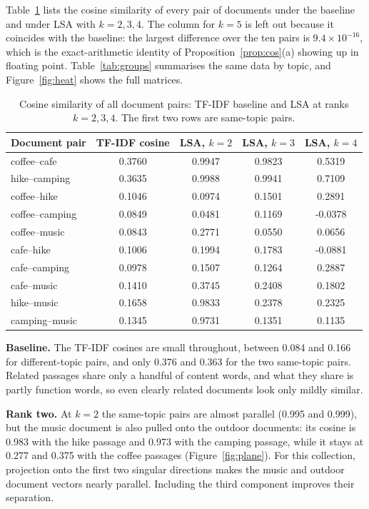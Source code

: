 \documentclass[12pt,a4paper]{report}
\theoremstyle{plain}
\theoremstyle{definition}
\theoremstyle{remark}
\theoremstyle{definition}
\begin{document}
Table~\ref{tab:pairs} lists the cosine similarity of every pair of documents under the baseline and under LSA with $k=2,3,4$. The column for $k=5$ is left out because it coincides with the baseline: the largest difference over the ten pairs is $9.4\times10^{-16}$, which is the exact-arithmetic identity of Proposition~\ref{prop:cos}(a) showing up in floating point. Table~\ref{tab:groups} summarises the same data by topic, and Figure~\ref{fig:heat} shows the full matrices.

\begin{table}[H]
\centering
\caption{Cosine similarity of all document pairs: TF-IDF baseline and LSA at ranks $k=2,3,4$. The first two rows are same-topic pairs.}\label{tab:pairs}
\begin{tabular}{@{}lcccc@{}}
\toprule
Document pair & TF-IDF cosine & LSA, $k=2$ & LSA, $k=3$ & LSA, $k=4$\\
\midrule
coffee--cafe & 0.3760 & 0.9947 & 0.9823 & 0.5319\\
hike--camping & 0.3635 & 0.9988 & 0.9941 & 0.7109\\
\midrule
coffee--hike & 0.1046 & 0.0974 & 0.1501 & 0.2891\\
coffee--camping & 0.0849 & 0.0481 & 0.1169 & -0.0378\\
coffee--music & 0.0843 & 0.2771 & 0.0550 & 0.0656\\
cafe--hike & 0.1006 & 0.1994 & 0.1783 & -0.0881\\
cafe--camping & 0.0978 & 0.1507 & 0.1264 & 0.2887\\
cafe--music & 0.1410 & 0.3745 & 0.2408 & 0.1802\\
hike--music & 0.1658 & 0.9833 & 0.2378 & 0.2325\\
camping--music & 0.1345 & 0.9731 & 0.1351 & 0.1135\\
\bottomrule
\end{tabular}
\end{table}

\textbf{Baseline.} The TF-IDF cosines are small throughout, between 0.084 and 0.166 for different-topic pairs, and only 0.376 and 0.363 for the two same-topic pairs. Related passages share only a handful of content words, and what they share is partly function words, so even clearly related documents look only mildly similar.

\textbf{Rank two.} At $k=2$ the same-topic pairs are almost parallel (0.995 and 0.999), but the music document is also pulled onto the outdoor documents: its cosine is 0.983 with the hike passage and 0.973 with the camping passage, while it stays at 0.277 and 0.375 with the coffee passages (Figure~\ref{fig:plane}). For this collection, projection onto the first two singular directions makes the music and outdoor document vectors nearly parallel. Including the third component improves their separation.
\end{document}
